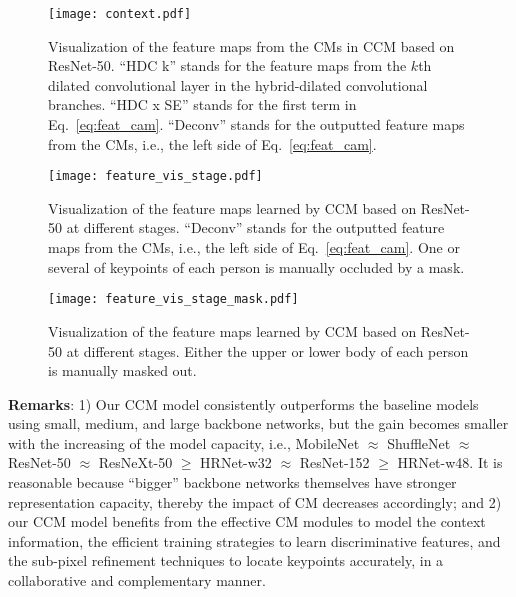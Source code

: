 \documentclass[twocolumn]{svjour3}          \smartqed  \usepackage{natbib}
\begin{document}
\begin{figure*}[t]
\begin{center}
   \texttt{[image: context.pdf]}
\end{center}
   \caption{Visualization of the feature maps from the CMs in CCM based on ResNet-50. ``HDC k'' stands for the feature maps from the $k${th} dilated convolutional layer in the hybrid-dilated convolutional branches. ``HDC x SE'' stands for the first term in Eq.~\eqref{eq:feat_cam}. ``Deconv'' stands for the outputted feature maps from the CMs, i.e., the left side of Eq.~\eqref{eq:feat_cam}.}
\label{fig:context}
\end{figure*}

\begin{figure}[!ht]
\begin{center}
   \texttt{[image: feature\_vis\_stage.pdf]}
\end{center}
   \caption{Visualization of the feature maps learned by CCM based on ResNet-50 at different stages. ``Deconv'' stands for the outputted feature maps from the CMs, i.e., the left side of Eq.~\eqref{eq:feat_cam}. One or several of keypoints of each person is manually occluded by a mask.}
\label{fig:feature_vis}
\end{figure}

\begin{figure}[!ht]
\begin{center}
   \texttt{[image: feature\_vis\_stage\_mask.pdf]}
\end{center}
   \caption{Visualization of the feature maps learned by CCM based on ResNet-50 at different stages. Either the upper or lower body of each person is manually masked out.}
\label{fig:feature_vis_mask}
\end{figure}

\textbf{Remarks}: 1) Our CCM model consistently outperforms the baseline models using small, medium, and large backbone networks, but the gain becomes smaller with the increasing of the model capacity, i.e., MobileNet $\approx$ ShuffleNet $\approx$ ResNet-50 $\approx$ ResNeXt-50 $\ge$ HRNet-w32 $\approx$ ResNet-152 $\ge$ HRNet-w48. It is reasonable because ``bigger'' backbone networks themselves have stronger representation capacity, thereby the impact of CM decreases accordingly; and 2) our CCM model benefits from the effective CM modules to model the context information, the efficient training strategies to learn discriminative features, and the sub-pixel refinement techniques to locate keypoints accurately, in a collaborative and complementary manner.  
\end{document}
